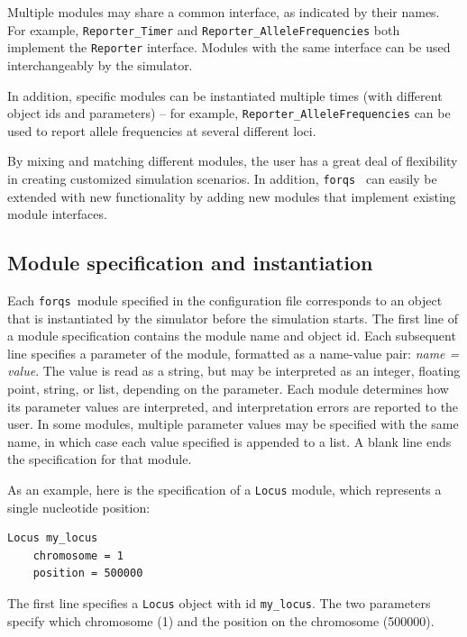 \documentclass{article}
\newcommand{\forqs}[0]{\texttt{forqs }}
\begin{document}
Multiple modules may share a common interface, as indicated by their names.
For example, \texttt{Reporter\_Timer} and \texttt{Reporter\_AlleleFrequencies} both implement the
\texttt{Reporter} interface.  Modules with the same interface can be used
interchangeably by the simulator.  

In addition, specific modules can be instantiated multiple times (with
different object ids and parameters) -- for example,
\texttt{Reporter\_AlleleFrequencies} can be used to report allele frequencies at several
different loci.

By mixing and matching different modules, the user has a great deal of
flexibility in creating customized simulation scenarios.  In addition, \forqs
can easily be extended with new functionality by adding new modules that implement
existing module interfaces.




\subsection{Module specification and instantiation}

Each \forqs module specified in the configuration file corresponds to an object
that is instantiated by the simulator before the simulation starts.  The first
line of a module specification contains the module name and object id.  Each
subsequent line specifies a parameter of the module, formatted as a name-value
pair: \emph{name = value}.  The value is read as a string, but may be
interpreted as an integer, floating point, string, or list, depending on the
parameter.   Each module determines how its parameter values are interpreted,
and interpretation errors are reported to the user.  In some modules, multiple
parameter values may be specified with the same name, in which case each value
specified is appended to a list.  A blank line ends the specification for that
module.

As an example, here is the specification of a \texttt{Locus} module, which 
represents a single nucleotide position:
\begin{small}
\begin{verbatim}
Locus my_locus
    chromosome = 1
    position = 500000
\end{verbatim}
\end{small}
The first line specifies a \texttt{Locus} object with id
\texttt{my\_locus}.  The two parameters specify which
chromosome (1) and the position on the chromosome (500000).
\end{document}
